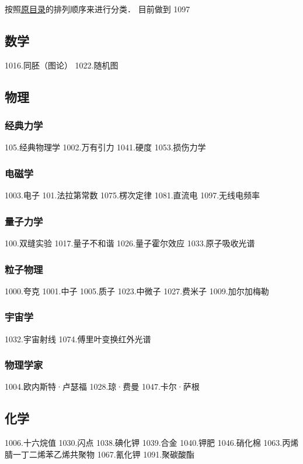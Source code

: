 
\begin{issues}
\issueDraft
\end{issues}

按照\href{https://wuli.wiki/assets/sogou}{原目录}的排列顺序来进行分类． 目前做到 1097

\subsection{数学}

1016.同胚（图论）
1022.随机图

\subsection{物理}
\subsubsection{经典力学}
105.经典物理学
1002.万有引力
1041.硬度
1053.损伤力学
\subsubsection{电磁学}
1003.电子
101.法拉第常数
1075.楞次定律
1081.直流电
1097.无线电频率
\subsubsection{量子力学}
100.双缝实验
1017.量子不和谐
1026.量子霍尔效应
1033.原子吸收光谱
\subsubsection{粒子物理}
1000.夸克
1001.中子
1005.质子
1023.中微子
1027.费米子
1009.加尔加梅勒
\subsubsection{宇宙学}
1032.宇宙射线
1074.傅里叶变换红外光谱
\subsubsection{物理学家}
1004.欧内斯特·卢瑟福
1028.琼·费曼
1047.卡尔·萨根

\subsection{化学}
1006.十六烷值
1030.闪点
1038.碘化钾
1039.合金
1040.钾肥
1046.硝化棉
1063.丙烯腈一丁二烯苯乙烯共聚物
1067.氰化钾
1091.聚碳酸酯

